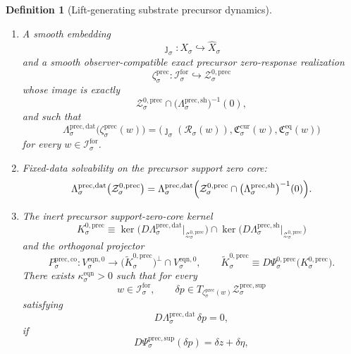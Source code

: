 \documentclass[11pt]{article}
\newcommand{\ForSpace}[1]{\mathcal I_{#1}^{\mathrm{for}}}
\newcommand{\Reduction}[1]{\mathcal R_{#1}}
\newcommand{\CurrentCarrier}[1]{\mathfrak C_{#1}^{\mathrm{cur}}}
\newcommand{\EqCarrier}[1]{\mathfrak C_{#1}^{\mathrm{eq}}}
\newcommand{\VisibleAffine}[1]{\widehat X_{#1}}
\newcommand{\EqnZero}[1]{V_{#1}^{\mathrm{eqn},0}}
\newcommand{\SeedHidden}[1]{\mathcal H_{#1}^{\mathrm{sup}}}
\newcommand{\PrecData}[1]{\Lambda_{#1}^{\mathrm{prec,dat}}}
\newcommand{\PrecShellMap}[1]{\Lambda_{#1}^{\mathrm{prec,sh}}}
\newcommand{\PrecSupportShell}[1]{\mathcal Z_{#1}^{\mathrm{prec,sup}}}
\newcommand{\PrecZeroCore}[1]{\mathcal Z_{#1}^{0,\mathrm{prec}}}
\newcommand{\PrecEqChart}[1]{\Psi_{#1}^{\mathrm{prec,sup}}}
\newcommand{\PrecZeroChart}[1]{\Psi_{#1}^{0,\mathrm{prec}}}
\newcommand{\PrecSplit}[1]{\Phi_{#1}^{\mathrm{prec}}}
\newcommand{\PrecCharge}[1]{\mathcal Q_{#1}^{\mathrm{prec}}}
\newcommand{\PrecResidual}[1]{\mathcal R_{#1}^{\mathrm{prec}}}
\newcommand{\PrecEmbed}[1]{\zeta_{#1}^{\mathrm{prec}}}
\newcommand{\PrecKernel}[1]{K_{#1}^{0,\mathrm{prec}}}
\newcommand{\PrecKernelCh}[1]{\widetilde K_{#1}^{0,\mathrm{prec}}}
\newcommand{\PrecStateComp}[1]{P_{#1}^{\mathrm{prec,co}}}
\newtheorem{definition}{Definition}
\begin{document}
\begin{definition}[Lift-generating substrate precursor dynamics]
\begin{enumerate}
\begin{equation}
    \text{for all }\eta\in\SeedHidden{\sigma}.
    \label{eq:precchargegap}
    \end{equation}
    Define the precursor support-shell hidden recorder by
    \begin{equation}
    \PrecResidual{\sigma}\bigl(\PrecSplit{\sigma}(z,\eta)\bigr)
    \equiv
    \PrecCharge{\sigma}(\eta).
    \label{eq:precresidual}
    \end{equation}
    \item A smooth embedding
    \[
    \jmath_{\sigma}:X_{\sigma}\hookrightarrow\VisibleAffine{\sigma}
    \]
    and a smooth observer-compatible exact precursor zero-response realization
    \[
    \PrecEmbed{\sigma}:\ForSpace{\sigma}\hookrightarrow\PrecZeroCore{\sigma}
    \]
    whose image is exactly
    \[
    \PrecZeroCore{\sigma}
    \cap
    \bigl(\PrecShellMap{\sigma}\bigr)^{-1}(0),
    \]
    and such that
    \begin{equation}
    \PrecData{\sigma}\bigl(\PrecEmbed{\sigma}(w)\bigr)
    =
    \bigl(
    \jmath_{\sigma}(\Reduction{\sigma}(w)),
    \CurrentCarrier{\sigma}(w),
    \EqCarrier{\sigma}(w)
    \bigr)
    \label{eq:preccompat}
    \end{equation}
    for every \(w\in\ForSpace{\sigma}\).
    \item Fixed-data solvability on the precursor support zero core:
    \begin{equation}
    \PrecData{\sigma}\bigl(\PrecZeroCore{\sigma}\bigr)
    =
    \PrecData{\sigma}\Bigl(
    \PrecZeroCore{\sigma}\cap
    \bigl(\PrecShellMap{\sigma}\bigr)^{-1}(0)
    \Bigr).
    \label{eq:precsolvability}
    \end{equation}
    \item The inert precursor support-zero-core kernel
    \[
    \PrecKernel{\sigma}
    \equiv
    \ker\bigl(D\PrecData{\sigma}\big|_{\PrecZeroCore{\sigma}}\bigr)
    \cap
    \ker\bigl(D\PrecShellMap{\sigma}\big|_{\PrecZeroCore{\sigma}}\bigr)
    \]
    and the orthogonal projector
    \[
    \PrecStateComp{\sigma}:
    \EqnZero{\sigma}\to
    \bigl(\PrecKernelCh{\sigma}\bigr)^{\perp}\cap\EqnZero{\sigma},
    \qquad
    \PrecKernelCh{\sigma}
    \equiv
    D\PrecZeroChart{\sigma}\bigl(\PrecKernel{\sigma}\bigr).
    \]
    There exists \(\kappa_{\sigma}^{\mathrm{eqn}}>0\) such that for every
    \[
    w\in\ForSpace{\sigma},
    \qquad
    \delta p\in T_{\PrecEmbed{\sigma}(w)}\PrecSupportShell{\sigma}
    \]
    satisfying
    \[
    D\PrecData{\sigma}\,\delta p=0,
    \]
    if
    \[
    D\PrecEqChart{\sigma}(\delta p)=\delta z+\delta\eta,
\]
\end{enumerate}
\end{definition}
\end{document}
